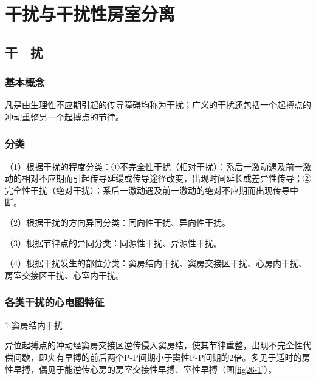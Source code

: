 \chapter{干扰与干扰性房室分离}

\protect\hypertarget{text00033.htmlux5cux23subid395}{}{}

\section{干　扰}

\protect\hypertarget{text00033.htmlux5cux23subid396}{}{}

\subsection{基本概念}

凡是由生理性不应期引起的传导障碍均称为干扰；广义的干扰还包括一个起搏点的冲动重整另一个起搏点的节律。

\protect\hypertarget{text00033.htmlux5cux23subid397}{}{}

\subsection{分类}

（1）根据干扰的程度分类：①不完全性干扰（相对干扰）：系后一激动遇及前一激动的相对不应期而引起传导延缓或传导途径改变，出现时间延长或差异性传导；②完全性干扰（绝对干扰）：系后一激动遇及前一激动的绝对不应期而出现传导中断。

（2）根据干扰的方向异同分类：同向性干扰、异向性干扰。

（3）根据节律点的异同分类：同源性干扰、异源性干扰。

（4）根据干扰发生的部位分类：窦房结内干扰、窦房交接区干扰、心房内干扰、房室交接区干扰、心室内干扰。

\protect\hypertarget{text00033.htmlux5cux23subid398}{}{}

\subsection{各类干扰的心电图特征}

1.窦房结内干扰

异位起搏点的冲动经窦房交接区逆传侵入窦房结，使其节律重整，出现不完全性代偿间歇，即夹有早搏的前后两个P-P间期小于窦性P-P间期的2倍。多见于适时的房性早搏，偶见于能逆传心房的房室交接性早搏、室性早搏（图\ref{fig26-1}）。

